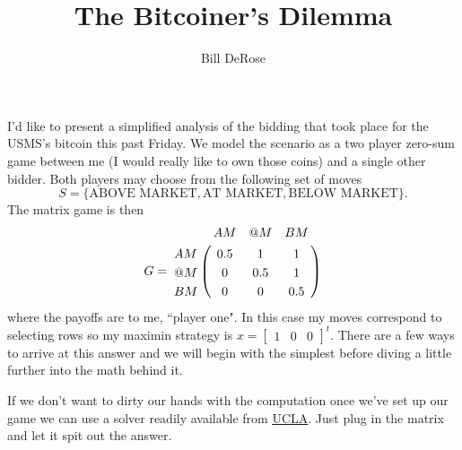 \documentclass[11pt, oneside]{article}     %
\title{The Bitcoiner's Dilemma}
\author{Bill DeRose}
\begin{document}

\maketitle
I'd like to present a simplified analysis of the bidding that took place for the 
USMS's bitcoin this past Friday. We model the scenario as a two player 
zero-sum game between me (I would really like to own those coins) 
and a single other bidder. Both players may choose from the following set of 
moves $$S =\{\mbox{ABOVE MARKET}, \mbox{AT MARKET}, \mbox{BELOW MARKET}\}.$$
The matrix game is then 
\begin{align*}
G = \bordermatrix{
      &   AM & @M & BM\cr
      AM & 0.5 & 1 & 1\cr
    	@M & 0 & 0.5 & 1\cr
			BM & 0 & 0 & 0.5\cr}
\end{align*}
where the payoffs are to me, ``player one". In this case my moves correspond to 
selecting rows so 
my maximin strategy is $x = \begin{bmatrix}1 & 0 & 0 \end{bmatrix}^t$. 
There are a few ways to arrive at this answer and we will begin with
the simplest before diving a little further into the math behind it.


If we don't want to dirty our hands with the computation once we've set
up our game we can use a solver readily available from
\href{http://www.math.ucla.edu/~tom/gamesolve.html}{\uline{UCLA}}. Just plug in the
matrix and let it spit out the answer.
\end{document}
